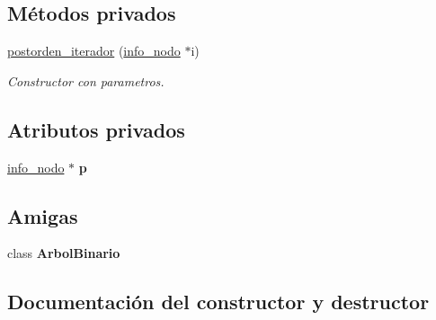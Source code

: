 \subsection*{Métodos privados}
\begin{DoxyCompactItemize}
\item 
\hyperlink{classArbolBinario_1_1postorden__iterador_af856eb02daa61de877ed51b3f7957dca}{postorden\+\_\+iterador} (\hyperlink{structArbolBinario_1_1info__nodo}{info\+\_\+nodo} $\ast$i)
\begin{DoxyCompactList}\small\item\em Constructor con parametros. \end{DoxyCompactList}\end{DoxyCompactItemize}
\subsection*{Atributos privados}
\begin{DoxyCompactItemize}
\item 
\mbox{\label{classArbolBinario_1_1postorden__iterador_a7864da027ee0969c3f784b3e8e0fe497}} 
\hyperlink{structArbolBinario_1_1info__nodo}{info\+\_\+nodo} $\ast$ {\bfseries p}
\end{DoxyCompactItemize}
\subsection*{Amigas}
\begin{DoxyCompactItemize}
\item 
\mbox{\label{classArbolBinario_1_1postorden__iterador_a7aaf1bc41122321eaeb4dcc50d489fe8}} 
class {\bfseries Arbol\+Binario}
\end{DoxyCompactItemize}


\subsection{Documentación del constructor y destructor}
\mbox{\label{classArbolBinario_1_1postorden__iterador_af856eb02daa61de877ed51b3f7957dca}} 
